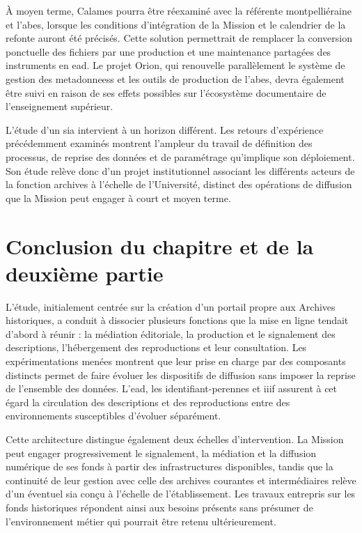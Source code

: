 À moyen terme, Calames pourra être réexaminé avec la référente montpelliéraine et l'\Gls{abes}, lorsque les conditions d'intégration de la Mission et le calendrier de la refonte auront été précisés. Cette solution permettrait de remplacer la conversion ponctuelle des fichiers par une production et une maintenance partagées des instruments en \gls{ead}. Le projet Orion, qui renouvelle parallèlement le système de gestion des \glspl{metadonnees} et les outils de production de l'\Gls{abes}, devra également être suivi en raison de ses effets possibles sur l'écosystème documentaire de l'enseignement supérieur.

L'étude d'un \gls{sia} intervient à un horizon différent. Les retours d'expérience précédemment examinés montrent l'ampleur du travail de définition des processus, de reprise des données et de paramétrage qu'implique son déploiement. Son étude relève donc d'un projet institutionnel associant les différents acteurs de la fonction archives à l'échelle de l'Université, distinct des opérations de diffusion que la Mission peut engager à court et moyen terme.


\section*{Conclusion du chapitre et de la deuxième partie}
\label{sec:conclusion-partie-ii}

L'étude, initialement centrée sur la création d'un portail propre aux Archives historiques, a conduit à dissocier plusieurs fonctions que la mise en ligne tendait d'abord à réunir : la médiation éditoriale, la production et le \gls{signalement} des descriptions, l'hébergement des reproductions et leur consultation. Les expérimentations menées montrent que leur prise en charge par des composants distincts permet de faire évoluer les dispositifs de diffusion sans imposer la reprise de l'ensemble des données. L'\gls{ead}, les \glspl{identifiant-perenne} et \gls{iiif} assurent à cet égard la circulation des descriptions et des reproductions entre des environnements susceptibles d'évoluer séparément.

Cette architecture distingue également deux échelles d'intervention. La Mission peut engager progressivement le \gls{signalement}, la médiation et la diffusion numérique de ses fonds à partir des infrastructures disponibles, tandis que la continuité de leur gestion avec celle des archives courantes et intermédiaires relève d'un éventuel \gls{sia} conçu à l'échelle de l'établissement. Les travaux entrepris sur les fonds historiques répondent ainsi aux besoins présents sans présumer de l'environnement métier qui pourrait être retenu ultérieurement.


